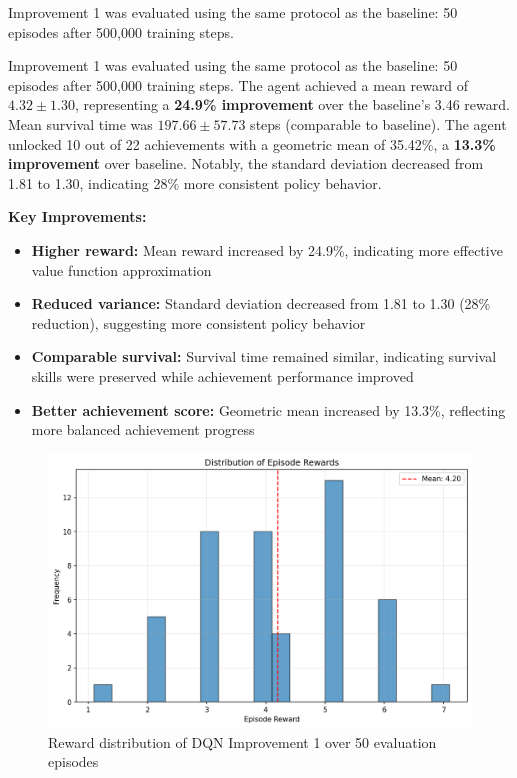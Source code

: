 \documentclass[twocolumn]{article}
\begin{document}
Improvement 1 was evaluated using the same protocol as the baseline: 50 episodes after 500,000 training steps.

Improvement 1 was evaluated using the same protocol as the baseline: 50 episodes after 500,000 training steps. The agent achieved a mean reward of $4.32 \pm 1.30$, representing a \textbf{24.9\% improvement} over the baseline's 3.46 reward. Mean survival time was $197.66 \pm 57.73$ steps (comparable to baseline). The agent unlocked 10 out of 22 achievements with a geometric mean of 35.42\%, a \textbf{13.3\% improvement} over baseline. Notably, the standard deviation decreased from 1.81 to 1.30, indicating 28\% more consistent policy behavior.

\textbf{Key Improvements:}

\begin{itemize}
    \item \textbf{Higher reward:} Mean reward increased by 24.9\%, indicating more effective value function approximation
    \item \textbf{Reduced variance:} Standard deviation decreased from 1.81 to 1.30 (28\% reduction), suggesting more consistent policy behavior
    \item \textbf{Comparable survival:} Survival time remained similar, indicating survival skills were preserved while achievement performance improved
    \item \textbf{Better achievement score:} Geometric mean increased by 13.3\%, reflecting more balanced achievement progress
\end{itemize}

\begin{figure}[H]
    \centering
    \includegraphics[width=0.8\linewidth]{images/DQNImprov1reward_distribution.png}
    \caption{Reward distribution of DQN Improvement 1 over 50 evaluation episodes}
    \label{fig:dqn_improv1_reward}
\end{figure}
\end{document}
